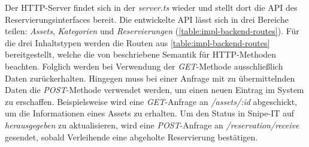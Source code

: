 Der HTTP-Server findet sich in der \textit{server.ts} wieder und stellt dort die
API des Reservierungsinterfaces bereit. Die entwickelte API lässt sich in drei
Bereiche teilen: \textit{Assets}, \textit{Kategorien} und
\textit{Reservierungen} (\ref{table:impl-backend-routes}). Für die drei
Inhaltstypen werden die Routen aus \ref{table:impl-backend-routes}
bereitgestellt, welche die von  beschriebene
Semantik für HTTP-Methoden beachten. Folglich werden bei Verwendung der
\textit{GET}-Methode ausschließlich Daten zurückerhalten. Hingegen muss bei
einer Anfrage mit zu übermittelnden Daten die \textit{POST}-Methode verwendet
werden, um einen neuen Eintrag im System zu erschaffen. Beispielsweise wird eine
\textit{GET}-Anfrage an \textit{/assets/:id} abgeschickt, um die Informationen
eines Assets zu erhalten. Um den Status in Snipe-IT auf \textit{herausgegeben}
zu aktualisieren, wird eine \textit{POST}-Anfrage an
\textit{/reservation/receive} gesendet, sobald Verleihende eine abgeholte
Reservierung bestätigen.

